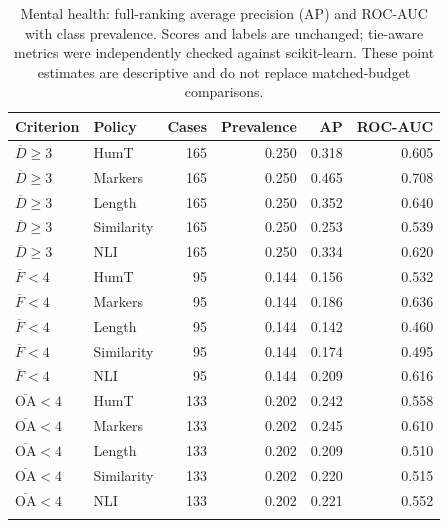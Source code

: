 \begin{table}[p]
\centering\footnotesize
\caption{Mental health: full-ranking average precision (AP) and ROC-AUC with class prevalence. Scores and labels are unchanged; tie-aware metrics were independently checked against scikit-learn. These point estimates are descriptive and do not replace matched-budget comparisons.}
\label{tab:ranking_mental_health}
\begin{tabular}{llrrrr}
\toprule
Criterion & Policy & Cases & Prevalence & AP & ROC-AUC \\
\midrule
$\overline D\geq3$ & HumT & 165 & 0.250 & 0.318 & 0.605 \\
$\overline D\geq3$ & Markers & 165 & 0.250 & 0.465 & 0.708 \\
$\overline D\geq3$ & Length & 165 & 0.250 & 0.352 & 0.640 \\
$\overline D\geq3$ & Similarity & 165 & 0.250 & 0.253 & 0.539 \\
$\overline D\geq3$ & NLI & 165 & 0.250 & 0.334 & 0.620 \\
\addlinespace
$\overline F<4$ & HumT & 95 & 0.144 & 0.156 & 0.532 \\
$\overline F<4$ & Markers & 95 & 0.144 & 0.186 & 0.636 \\
$\overline F<4$ & Length & 95 & 0.144 & 0.142 & 0.460 \\
$\overline F<4$ & Similarity & 95 & 0.144 & 0.174 & 0.495 \\
$\overline F<4$ & NLI & 95 & 0.144 & 0.209 & 0.616 \\
\addlinespace
$\overline{\mathrm{OA}}<4$ & HumT & 133 & 0.202 & 0.242 & 0.558 \\
$\overline{\mathrm{OA}}<4$ & Markers & 133 & 0.202 & 0.245 & 0.610 \\
$\overline{\mathrm{OA}}<4$ & Length & 133 & 0.202 & 0.209 & 0.510 \\
$\overline{\mathrm{OA}}<4$ & Similarity & 133 & 0.202 & 0.220 & 0.515 \\
$\overline{\mathrm{OA}}<4$ & NLI & 133 & 0.202 & 0.221 & 0.552 \\
\addlinespace
\bottomrule
\end{tabular}
\end{table}

